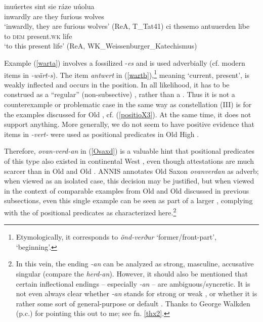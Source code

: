\documentclass[output=paper,colorlinks,citecolor=brown]{langscibook}
\begin{document}
\begin{exe}
  \ex \label{wart}
    \begin{xlist}
        \ex \label{warta} \gll inuúertes sint sie ráze uúolua   \\ 
          inwardly are they furious wolves    \\ 
        \glt `inwardly, they are furious wolves' (ReA, T\_Tat41)  
        \ex \label{wartb} \gll  ci thesemo antuuerden libe   \\ 
           to  \textsc{dem} present.\textsc{wk}  life     \\ 
        \glt `to this present life' (ReA, WK\_Weissenburger\_Katechismus)   
    \end{xlist}
\end{exe}

Example (\ref{warta}) involves a fossilized  -\textit{es} and is used adverbially (cf. modern  items in \textit{-wärt-s}). The item \textit{antwert} in (\ref{wartb}),\footnote{Etymologically, it corresponds to  \textit{önd-verður} `former/front-part', `beginning'. } meaning `current, present', is weakly inflected and occurs in the  position. In all likelihood, it has to be construed as a ``regular'' (non-subsective) , rather than a . Thus it is not a counterexample or problematic case in the same way as constellation (III) is for the examples discussed for Old , cf. (\ref{positioX3}).  At the same time, it does not support anything. More generally, we do not seem to have positive evidence that items in \textit{-vert-} were used as positional predicates in Old High .


Therefore, \textit{ovan-verd-an} in  (\ref{Osaxd}) is a valuable hint that positional predicates of this type also existed in continental West , even though attestations are much scarcer than in Old  and Old . ANNIS annotates Old Saxon  \textit{ovanverdan} as adverb; when viewed as an isolated case, this decision may be justified, but when viewed in the context of comparable examples from Old  and Old  discussed in previous subsections, even this single example can be seen as part of a larger , complying with the  of positional predicates as characterized here.\footnote{\label{thxGeorge}In this vein, the ending \textit{-an} can be analyzed as strong, masculine, accusative singular (compare the   \textit{herd-an}). However, it should also be mentioned that certain inflectional endings -- especially \textit{-an} -- are ambiguous/syncretic. It is not even always clear whether \textit{-an} stands for strong or weak , or whether it is rather some sort of general-purpose or default . Thanks to George Walkden (p.c.) for pointing this out to me; see fn. \ref{thx2}.   } 
\end{document}
